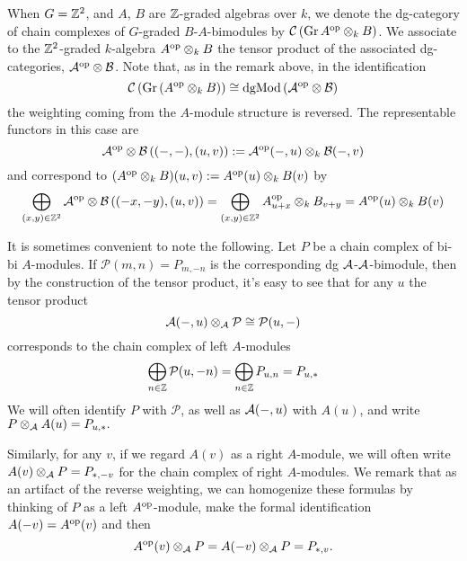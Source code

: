 When \(G = \mathbb{Z}^2\), and \(A\), \(B\) are \(\mathbb{Z}\)-graded algebras over \(k\), we denote the dg-category of chain complexes of \(G\)-graded \(B\)-\(A\)-bimodules by \(\mathcal{C}\left(\operatorname{Gr}A^{\operatorname{op}} \otimes_k B\right)\).
We associate to the \(\mathbb{Z}^2\)-graded \(k\)-algebra \(A^{\operatorname{op}} \otimes_k B\) the tensor product of the associated dg-categories, \(\mathcal{A}^{\operatorname{op}} \otimes \mathcal{B}\).
Note that, as in the remark above, in the identification
\[\mathcal{C}\left(\operatorname{Gr}\left(A^{\operatorname{op}} \otimes_k B\right)\right) \cong \operatorname{dgMod}\left(\mathcal{A}^{\operatorname{op}} \otimes \mathcal{B}\right)\]
the weighting coming from the \(A\)-module structure is reversed.
The representable functors in this case are
\[\mathcal{A}^{\operatorname{op}} \otimes \mathcal{B}\left((-,-), (u,v)\right) := \mathcal{A}^{\operatorname{op}}(-, u) \otimes_k \mathcal{B}(-,v)\]
and correspond to \((A^{\operatorname{op}} \otimes_k B)(u,v) := A^{\operatorname{op}}(u) \otimes_k B(v)\) by 
\[\bigoplus_{(x,y) \in \mathbb{Z}^2} \mathcal{A}^{\operatorname{op}} \otimes \mathcal{B}\left((-x,-y),(u,v)\right) = \bigoplus_{(x,y) \in \mathbb{Z}^2} A^{\operatorname{op}}_{u + x} \otimes_k B_{v + y} = A^{\operatorname{op}}(u) \otimes_k B(v)\]


\begin{remark}\label{remark: tensor with twist}
  It is sometimes convenient to note the following.
  Let \(P\) be a chain complex of bi-bi \(A\)-modules.
  If \(\mathcal{P}(m,n) = P_{m,-n}\) is the corresponding dg \(\mathcal{A}\)-\(\mathcal{A}\)-bimodule, then by the construction of the tensor product, it's easy to see that for any \(u\) the tensor product 
  \[\mathcal{A}(-, u) \otimes_{\mathcal{A}} \mathcal{P} \cong \mathcal{P}(u, -)\]
  corresponds to the chain complex of left \(A\)-modules
  \[\bigoplus_{n \in \mathbb{Z}} \mathcal{P}(u,-n) = \bigoplus_{n \in \mathbb{Z}} P_{u,n} = P_{u, \ast}\]
  We will often identify \(P\) with \(\mathcal{P}\), as well as \(\mathcal{A}(-, u)\) with \(A(u)\), and write \({P \otimes_{\mathcal{A}} A(u)= P_{u,\ast}}.\)

  Similarly, for any \(v\), if we regard \(A(v)\) as a right \(A\)-module, we will often write \({A(v) \otimes_{\mathcal{A}} P = P_{\ast,-v}}\) for the chain complex of right \(A\)-modules.
  We remark that as an artifact of the reverse weighting, we can homogenize these formulas by thinking of \(P\) as a left \(A^{\operatorname{op}}\)-module, make the formal identification \(A(-v) = A^{\operatorname{op}}(v)\) and then
  \[A^{\operatorname{op}}(v) \otimes_{\mathcal{A}} P = A(-v) \otimes_{\mathcal{A}} P = P_{\ast,v}.\]
\end{remark}
